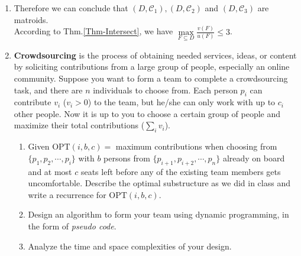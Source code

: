 \documentclass[12pt,a4paper]{article}
\makeatletter
\newtheorem*{solution}{Solution}
\theoremstyle{definition}
\renewenvironment{solution}[1][Solution] {\par\pushQED{\qed}\normalfont\topsep6\p@\@plus6\p@\relax\trivlist\item[\hskip\labelsep\bfseries#1\@addpunct{.}]\ignorespaces}{\popQED\endtrivlist\@endpefalse} \makeatother
\makeatother
\begin{document}
\begin{enumerate}
\begin{solution}
\begin{enumerate}
			Therefore we can conclude that $ (D,\mathcal{C}_1),(D,\mathcal{C}_2) $ and $ (D,\mathcal{C}_3) $ are matroids.\\
			According to Thm.\ref{Thm-Intersect}, we have  $\max\limits_{F \subseteq D} \frac{v(F)}{u(F)} \leq 3$. 
		\end{enumerate}
	\end{solution}


	\item
	\textbf{Crowdsourcing} is the process of obtaining needed services, ideas, or content by soliciting contributions from a large group of people, especially an online community. Suppose you want to form a team to complete a crowdsourcing task, and there are $n$ individuals to choose from. Each person $p_i$ can contribute $v_i$ ($v_i > 0$) to the team, but he/she can only work with up to $c_i$ other people. Now it is up to you to choose a certain group of people and maximize their total contributions ($\sum_i{v_i}$).
	
	\begin{enumerate}
		\item Given $\text{OPT}(i, b, c)=$ maximum contributions when choosing from $\{p_1, p_2, \cdots, p_i\}$ with $b$ persons from $\{p_{i+1}, p_{i+2}, \cdots, p_n\}$ already on board and at most $c$ seats left before any of the existing team members gets uncomfortable. Describe the optimal substructure as we did in class and write a recurrence for $\text{OPT}(i, b, c)$.
		\item Design an algorithm to form your team using dynamic programming, in the form of \emph{pseudo code}.
        \item Analyze the time and space complexities of your design.
	\end{enumerate}


\end{enumerate}
\end{document}
